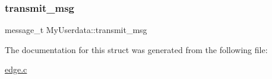 \subsubsection{\texorpdfstring{transmit\+\_\+msg}{transmit\_msg}}
{\footnotesize\ttfamily message\+\_\+t My\+Userdata\+::transmit\+\_\+msg}



The documentation for this struct was generated from the following file\+:\begin{DoxyCompactItemize}
\item 
\hyperlink{edge_8c}{edge.\+c}\end{DoxyCompactItemize}
